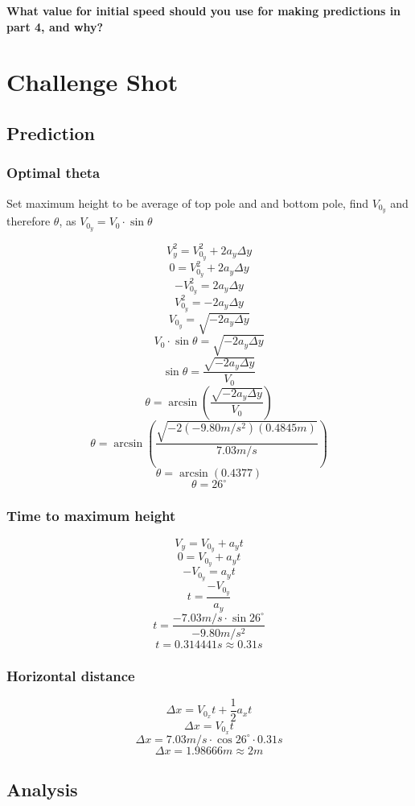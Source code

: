 \documentclass[11pt, letterpaper, includehead]{article}
\begin{document}
\textbf{What value for initial speed should you use for making predictions in part 4, and
why?}

\section{Challenge Shot} %
\subsection{Prediction} %
\subsubsection{Optimal theta} %
Set maximum height to be average of top pole and and bottom pole, find $V_{0_y}$ and therefore $\theta$,
as $V_{0_y} = V_0\cdot\sin\theta$

$$V_y^2 = V_{0_y}^2 + 2a_y\Delta y$$
$$0 = V_{0_y}^2 + 2a_y\Delta y$$
$$-V_{0_y}^2 = 2a_y\Delta y$$
$$V_{0_y}^2 = -2a_y\Delta y$$
$$V_{0_y} = \sqrt{-2a_y\Delta y}$$
$$V_0\cdot\sin\theta = \sqrt{-2a_y\Delta y}$$
$$\sin\theta = \frac{\sqrt{-2a_y\Delta y}}{V_0}$$
$$\theta = \arcsin\left(\frac{\sqrt{-2a_y\Delta y}}{V_0}\right)$$
$$\theta = \arcsin\left(\frac{\sqrt{-2(-9.80m/s^2)(0.4845m)}}{7.03m/s}\right)$$
$$\theta = \arcsin(0.4377)$$
$$\theta = 26^{\circ}$$
\subsubsection{Time to maximum height} %
$$V_y = V_{0_y} + a_yt$$
$$0 = V_{0_y} + a_yt$$
$$-V_{0_y} = a_yt$$
$$t = \frac{-V_{0_y}}{a_y}$$
$$t = \frac{-7.03m/s\cdot\sin26^{\circ}}{-9.80m/s^2}$$
$$t = 0.314441s \approx 0.31s$$
\subsubsection{Horizontal distance} %
$$\Delta x = V_{0_x}t + \frac{1}{2}a_xt$$
$$\Delta x = V_{0_x}t$$
$$\Delta x = 7.03m/s\cdot \cos26^{\circ}\cdot 0.31s$$
$$\Delta x = 1.98666m \approx 2m$$
\subsection{Analysis}  %
\end{document}
